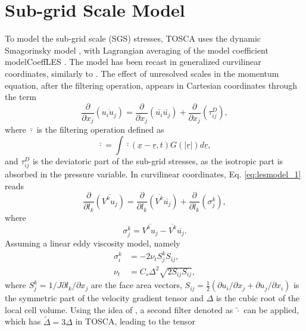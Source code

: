 \section{Sub-grid Scale Model}
\label{sec:subGridScaleModel}
To model the sub-grid scale (\acrshort{SGS}) stresses, TOSCA uses the dynamic Smagorinsky model \citep{GermanoEtAl1991,Lilly1992}, with Lagrangian averaging of the model coefficient \gls{modelCoeffLES} \citep{MeneveauEtAl1996}. The model has been recast in generalized curvilinear coordinates, similarly to \cite{ArmenioPiomelli2000}. The effect of unresolved scales in the momentum equation, after the filtering operation, appears in Cartesian coordinates through the term
\begin{equation}
	\frac{\partial}{\partial x_j}\left(\overline{u_iu_j}\right) = \frac{\partial}{\partial x_j}\left(\bar{u_i}\bar{u_j}\right) + \frac{\partial}{\partial x_j}\left(\tau_{ij}^D\right) ,\label{eq:lesmodel_1}
\end{equation}
where $\bar{\cdot}$ is the filtering operation defined as 
\begin{equation}
	\bar{\cdot} = \int\bar{\cdot}(\underline{x}-\underline{r},t)G(|\underline{r}|)d\underline{r} ,\label{eq:lesfilter}
\end{equation}
and $\tau_{ij}^D$ is the deviatoric part of the sub-grid stresses, as the isotropic part is absorbed in the pressure variable. In curvilinear coordinates, Eq. \ref{eq:lesmodel_1} reads
\begin{equation}
	\frac{\partial}{\partial l_k}\left(\overline{V^ku_j}\right) = \frac{\partial}{\partial l_k}\left(\overline{V^k}\overline{u_j}\right) + \frac{\partial}{\partial l_k}\left(\sigma_j^k\right) , \label{eq:lesmodel_2}
\end{equation}
where
\begin{equation}
	\sigma_j^k = \overline{V^ku_j} - \overline{V^k}\overline{u_j}.
\end{equation}
Assuming a linear eddy viscosity model, namely
\begin{align}
	\sigma_i^k &= -2\nu_tS_j^kS_{ij}, \label{eq:lesmodel_3} \\
	\nu_t &= C_s\Delta^2 \sqrt{2S_{ij}S_{ij}} \label{eq:lesmodel_4},
\end{align}
where $S_j^k = 1/J \partial l_k / \partial x_j$ are the face area vectors, $S_{ij} = \frac{1}{2}(\partial u_i/\partial x_j + \partial u_j/\partial x_i)$ is the symmetric part of the velocity gradient tensor and $\Delta$ is the cubic root of the local cell volume. Using the idea of \cite{GermanoEtAl1991}, a second filter denoted as $\widetilde{\cdot}$ can be applied, which has $\widetilde{\Delta} = 3\Delta$ in TOSCA, leading to the tensor
